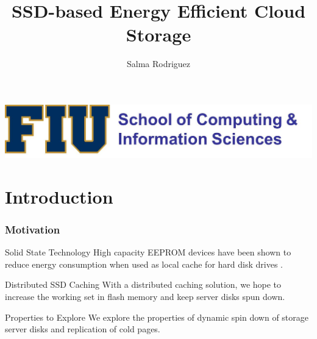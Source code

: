 \documentclass{beamer}
\title{SSD-based Energy Efficient Cloud Storage}
\author{Salma Rodriguez}
\institute [FIU]{
    {\small{\emph{srodr063@fiu.edu}}} \\
    \emph{Florida International University}
}
\begin{document}
\begin{frame}
    \titlepage
    \begin{center}
    	\includegraphics[scale=.31]{fiu_logo.jpg}
    \end{center}
\end{frame}
%
\section{Introduction}
%
\begin{frame}
    \frametitle{Motivation}
    \begin{block}
	{Solid State Technology}
	High capacity EEPROM devices have been shown to
	reduce energy consumption when used
	as local cache for hard disk drives \cite{key2,key3}.
    \end{block}
    \vspace{7pt}
    \begin{block}
	{Distributed SSD Caching}
	With a distributed caching solution, we hope to increase
	the working set in flash memory and keep server disks spun down.
    \end{block}
    \vspace{7pt}
    \begin{block}
	{Properties to Explore}
	We explore the properties of dynamic spin down of storage
	server disks and replication of cold pages.
    \end{block}
\end{frame}
\end{document}
